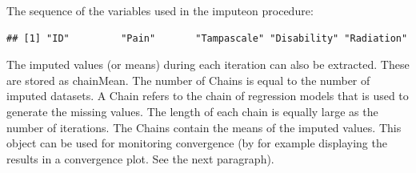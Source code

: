 \documentclass[]{book}
\newenvironment{Shaded}{\begin{snugshade}}{\end{snugshade}}
\newcommand{\OperatorTok}[1]{\textcolor[rgb]{0.81,0.36,0.00}{\textbf{#1}}}
\newcommand{\NormalTok}[1]{#1}
\begin{document}
The sequence of the variables used in the imputeon procedure:

\begin{Shaded}
\end{Shaded}

\begin{verbatim}
## [1] "ID"         "Pain"       "Tampascale" "Disability" "Radiation"
\end{verbatim}

The imputed values (or means) during each iteration can also be
extracted. These are stored as chainMean. The number of Chains is equal
to the number of imputed datasets. A Chain refers to the chain of
regression models that is used to generate the missing values. The
length of each chain is equally large as the number of iterations. The
Chains contain the means of the imputed values. This object can be used
for monitoring convergence (by for example displaying the results in a
convergence plot. See the next paragraph).

\begin{Shaded}
\end{Shaded}
\end{document}
